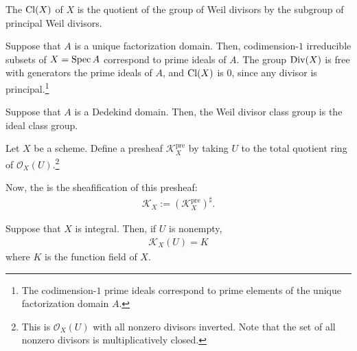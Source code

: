 \documentclass [11 pt, oneside] {article}
\begin{document}
\begin{definition}\label{}\text{}
The  $\operatorname{Cl}(X)$ of $X$ is the quotient of the group of Weil divisors by the subgroup of principal Weil divisors.
\end{definition}


\begin{example}[ ]\label{}\text{}
Suppose that $A$ is a unique factorization domain. Then, codimension-$1$ irreducible subsets of $X= \operatorname{Spec} A$ correspond to prime ideals of $A$. The group $\operatorname{Div} (X)$ is free with generators the prime ideals of $A$, and $\operatorname{Cl} (X)$ is $0$, since any divisor is principal.\footnote{The codimension-$1$ prime ideals correspond to prime elements of the unique factorization domain $A$.}
\end{example}

\begin{example}[ ]\label{}\text{}
Suppose that $A$ is a Dedekind domain. Then, the Weil divisor class group is the ideal class group.
\end{example}


Let $X$ be a scheme. Define a presheaf $\mathscr{K}^{\textrm{pre}}_X$ by taking $U$ to the total quotient ring of $\mathscr{O}_X(U)$.\footnote{This is $\mathscr{O}_X(U)$ with all nonzero divisors inverted. Note that the set of all nonzero divisors is multiplicatively closed.}

Now, the  is the sheafification of this presheaf:
\begin{align*}
	\mathscr{K}_X := (\mathscr{K}^{\textrm{pre}}_X)^\sharp.
\end{align*}

Suppose that $X$ is integral. Then, if $U$ is nonempty,
\begin{align*}
	\mathscr{K}_X(U) = K
\end{align*}
where $K$ is the function field of $X$.
\end{document}
